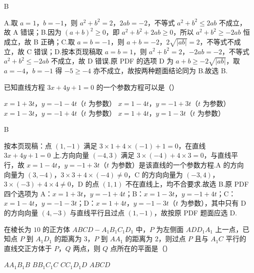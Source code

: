 \begin{answer}
B
\end{answer}

\begin{solution}
A.取 \(a=1\)，\(b=-1\)，则 \(a^2+b^2=2\)，\(2ab=-2\)，不等式 \(a^2+b^2\le2ab\) 不成立，故 A 错误；B.因为 \((a+b)^2\ge0\)，即 \(a^2+b^2+2ab\ge0\)，所以 \(a^2+b^2\ge-2ab\) 恒成立，故 B 正确；C.取 \(a=b=-1\)，则 \(a+b=-2\)，\(2\sqrt{|ab|}=2\)，不等式不成立，故 C 错误；D.按本页现稿取 \(a=b=1\)，则 \(a^2+b^2=2\)，\(-2ab=-2\)，不等式 \(a^2+b^2\le-2ab\) 不成立，故 D 错误.原 PDF 的选项 D 为 \(a+b\ge-2\sqrt{|ab|}\)，取 \(a=-4\)，\(b=-1\) 得 \(-5\ge-4\) 亦不成立，故按两种题面结论同为 B.故选 B.
\end{solution}

\begin{problem}
已知直线方程 \(3x+4y+1=0\) 的一个参数方程可以是（\quad）

\choices
    {\(x=1+3t\)，\(y=-1-4t\)（\(t\) 为参数）}
    {\(x=1-4t\)，\(y=-1+3t\)（\(t\) 为参数）}
    {\(x=1-3t\)，\(y=-1+4t\)（\(t\) 为参数）}
    {\(x=1+4t\)，\(y=1-3t\)（\(t\) 为参数）}
\end{problem}

\begin{answer}
B
\end{answer}

\begin{solution}
按本页现稿：点 \((1,-1)\) 满足 \(3\times1+4\times(-1)+1=0\)，在直线 \(3x+4y+1=0\) 上.方向向量 \((-4,3)\) 满足 \(3\times(-4)+4\times3=0\)，与直线平行，故 \(x=1-4t\)，\(y=-1+3t\)（\(t\) 为参数）是该直线的一个参数方程.A 的方向向量为 \((3,-4)\)，\(3\times3+4\times(-4)\ne0\)，C 的方向向量为 \((-3,4)\)，\(3\times(-3)+4\times4\ne0\)，D 的点 \((1,1)\) 不在直线上，均不合要求.故选 B.原 PDF 四个选项为 A：\(x=1+3t\)，\(y=-1+4t\)；B：\(x=1-3t\)，\(y=-1+4t\)；C：\(x=1-4t\)，\(y=-1-3t\)；D：\(x=1+4t\)，\(y=-1-3t\)（\(t\) 为参数），其中只有 D 的方向向量 \((4,-3)\) 与直线平行且过点 \((1,-1)\)，故按原 PDF 题面应选 D.
\end{solution}

\begin{problem}
在棱长为 \(10\) 的正方体 \(ABCD-A_1B_1C_1D_1\) 中，\(P\) 为左侧面 \(ADD_1A_1\) 上一点，已知点 \(P\) 到 \(A_1D_1\) 的距离为 \(3\)，\(P\) 到 \(AA_1\) 的距离为 \(2\)，则过点 \(P\) 且与 \(A_1C\) 平行的直线交正方体于 \(P\)，\(Q\) 两点，则 \(Q\) 点所在的平面是（\quad）


\choices
    {\(AA_1B_1B\)}
    {\(BB_1C_1C\)}
    {\(CC_1D_1D\)}
    {\(ABCD\)}
\end{problem}

